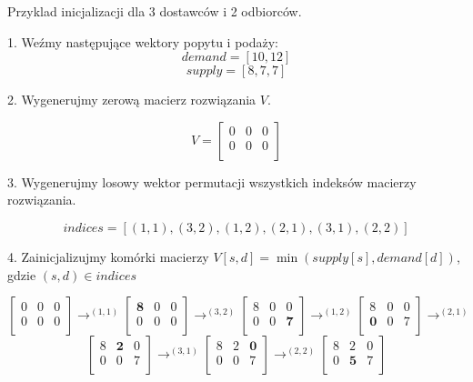 \begin{example}
    Przyklad inicjalizacji dla 3 dostawców i 2 odbiorców.

    1. Weźmy następujące wektory popytu i podaży:
    $$demand = [10, 12]$$
    $$supply = [8, 7, 7]$$

    2. Wygenerujmy zerową macierz rozwiązania $V$.

    $$
        V
        =
        \begin{bmatrix}
            0 & 0 & 0 \\
            0 & 0 & 0 \\
        \end{bmatrix}
    $$

    3. Wygenerujmy losowy wektor permutacji wszystkich indeksów macierzy rozwiązania.

    $$indices = [(1,1), (3,2), (1,2), (2,1), (3,1), (2,2)]$$

    4. Zainicjalizujmy komórki macierzy $V[s,d] = \min(supply[s], demand[d])$, gdzie $(s,d) \in indices$
    
    $$
        \begin{bmatrix}
            0 & 0 & 0 \\
            0 & 0 & 0 \\
        \end{bmatrix}
        \rightarrow^{(1,1)}
        \begin{bmatrix}
            \textbf{8} & 0 & 0 \\
            0 & 0 & 0 \\
        \end{bmatrix}
        \rightarrow^{(3,2)}
        \begin{bmatrix}
            8 & 0 & 0 \\
            0 & 0 & \textbf{7} \\
        \end{bmatrix}
        \rightarrow^{(1,2)}
        \begin{bmatrix}
            8 & 0 & 0 \\
            \textbf{0} & 0 & 7 \\
        \end{bmatrix}
        \rightarrow^{(2,1)}
        $$
        $$
        \begin{bmatrix}
            8 & \textbf{2} & 0 \\
            0 & 0 & 7 \\
        \end{bmatrix}
        \rightarrow^{(3,1)}
        \begin{bmatrix}
            8 & 2 & \textbf{0} \\
            0 & 0 & 7 \\
        \end{bmatrix}
        \rightarrow^{(2,2)}
        \begin{bmatrix}
            8 & 2 & 0 \\
            0 & \textbf{5} & 7 \\
        \end{bmatrix}
    $$


\end{example}
